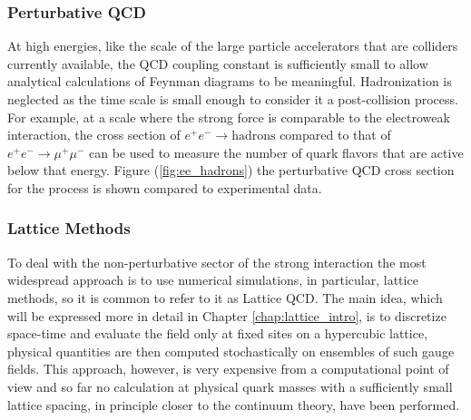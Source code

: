 \subsubsection{Perturbative QCD}
At high energies, like the scale of the large particle accelerators that are colliders currently available, the QCD coupling constant is sufficiently small to allow analytical calculations of Feynman diagrams to be meaningful. Hadronization is neglected as the time scale is small enough to consider it a post-collision process. 
For example, at a scale where the strong force is comparable to the electroweak interaction, the cross section of $e^+e^-\rightarrow \text{hadrons}$ compared to that of $e^+e^-\rightarrow \mu^+\mu^-$ can be used to measure the number of quark flavors that are active below that energy. Figure (\ref{fig:ee_hadrons}) the perturbative QCD cross section for the process is shown compared to experimental data.

\subsubsection{Lattice Methods}
To deal with the non-perturbative sector of the strong interaction the most widespread approach is to use numerical simulations, in particular, lattice methods, so it is common to refer to it as Lattice QCD. The main idea, which will be expressed more in detail in Chapter \ref{chap:lattice_intro}, is to discretize space-time and evaluate the field only at fixed sites on a hypercubic lattice, physical quantities are then computed stochastically on ensembles of such gauge fields. This approach, however, is very expensive from a computational point of view and so far no calculation at physical quark masses with a sufficiently small lattice spacing, in principle closer to the continuum theory, have been performed.

